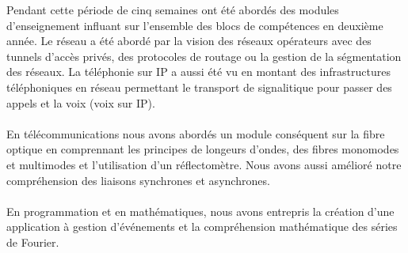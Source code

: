 \begin{resumo}
    Pendant cette période de cinq semaines ont été abordés des modules d'enseignement influant sur l'ensemble des blocs de compétences en deuxième année. Le réseau a été abordé par la vision des réseaux opérateurs avec des tunnels d'accès privés, des protocoles de routage ou la gestion de la ségmentation des réseaux. La téléphonie sur IP a aussi été vu en montant des infrastructures téléphoniques en réseau permettant le transport de signalitique pour passer des appels et la voix (voix sur IP).
    \\ \\
    En télécommunications nous avons abordés un module conséquent sur la fibre optique en comprennant les principes de longeurs d'ondes, des fibres monomodes et multimodes et l'utilisation d'un réflectomètre. Nous avons aussi amélioré notre compréhension des liaisons synchrones et asynchrones.
    \\ \\
    En programmation et en mathématiques, nous avons entrepris la création d'une application à gestion d'événements et la compréhension mathématique des séries de Fourier.
    
\end{resumo}